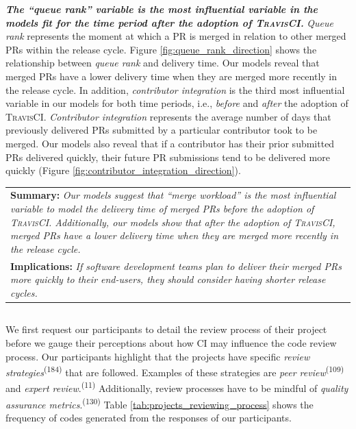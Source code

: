 \textit{\textbf{The ``queue rank'' variable is the most influential variable in
the models fit for the time period \textit{after} the adoption of \textsc{TravisCI}.}} \textit{Queue rank}
represents the moment at which a PR is merged in relation to other merged PRs within the
release cycle. Figure \ref{fig:queue_rank_direction} shows the relationship
between \textit{queue rank} and delivery time. Our models reveal that
merged PRs have a lower delivery time when they are merged more recently in the
release cycle. In addition, \textit{contributor integration} is the third most
influential variable in our models for both time periods, i.e., \textit{before} and
\textit{after} the adoption of \textsc{TravisCI}. {\em Contributor integration} represents the
average number of days that previously delivered PRs submitted by a
particular contributor took to be merged. Our models also reveal that if a contributor has
their prior submitted PRs delivered quickly, their future PR submissions tend
to be delivered more quickly (Figure
\ref{fig:contributor_integration_direction}).

\begin{center}
	\begin{tabular}{|p{}|}
		\hline
		\textbf{Summary:}
		\textit{Our models suggest that ``merge workload'' is the most
			influential variable to model the delivery time of merged PRs
			\textit{before} the adoption of \textsc{TravisCI}. Additionally, our
			models show that after the adoption of \textsc{TravisCI}, merged PRs have a lower delivery time when they are merged more recently in the release cycle.} \\
		\textbf{Implications:}
		\textit{If software development teams plan to deliver their merged PRs more quickly to their end-users, they should consider having shorter release cycles.}
		\\
		\hline
	\end{tabular}
\end{center}


\subsection*{\textbf{\RQseven}}

We first request our participants to detail the review process of their project before we gauge their perceptions about how CI may influence the code review process.
	Our participants highlight that the projects have specific \textit{review strategies}\textsuperscript{(184)} that are followed. Examples of these strategies are \textit{peer review}\textsuperscript{(109)} and \textit{expert review}.\textsuperscript{(11)} Additionally, review processes have to be mindful of \textit{quality assurance metrics}.\textsuperscript{(130)} Table \ref{tab:projects_reviewing_process} shows the frequency of codes generated from the responses of our participants.

